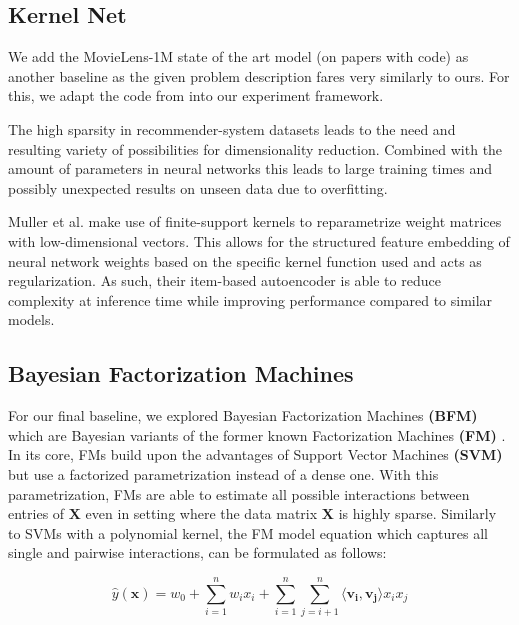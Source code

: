 \documentclass[10pt,conference,compsocconf]{IEEEtran}
\begin{document}
    \subsection{Kernel Net}
    We add the MovieLens-1M state of the art model (on papers with code) as another baseline as the given problem description fares very similarly to ours.
    For this, we adapt the code from \cite{pmlr-v80-muller18a, kernelNetGithub} into our experiment framework.

    The high sparsity in recommender-system datasets leads to the need and resulting variety of possibilities for dimensionality reduction.
    Combined with the amount of parameters in neural networks this leads to large training times and possibly
    unexpected results on unseen data due to overfitting.

    Muller et al. make use of finite-support kernels to reparametrize weight matrices with low-dimensional vectors.
    This allows for the structured feature embedding of neural network weights based on the specific kernel function used and
    acts as regularization.
    As such, their item-based autoencoder is able to reduce complexity at inference time while improving performance compared to similar models.\cite{pmlr-v80-muller18a}



    \subsection{Bayesian Factorization Machines}
    For our final baseline, we explored Bayesian Factorization Machines \textbf{(BFM)} which are Bayesian variants of the former known Factorization Machines \textbf{(FM)} \cite{rendle_factorization_2010}.
    In its core, FMs build upon the advantages of Support Vector Machines \textbf{(SVM)} but use a factorized parametrization instead of a dense one.
    With this parametrization, FMs are able to estimate all possible interactions between entries of $\mathbf{X}$ even in setting where the data matrix $\mathbf{X}$ is highly sparse.
    Similarly to SVMs with a polynomial kernel, the FM model equation which captures all single and pairwise interactions, can be formulated as follows:

    $$\hat{y}(\mathbf{x})=w_0+\sum^n_{i=1}w_ix_i + \sum^n_{i=1}\sum^n_{j=i+1}\langle \mathbf{v_i},\mathbf{v_j} \rangle x_ix_j$$
\end{document}
